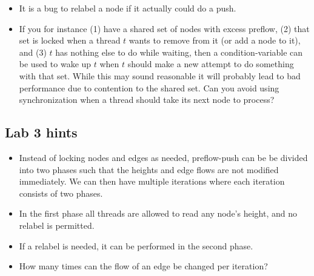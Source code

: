 \documentclass{forsete}
\begin{document}
{\begin{itemize}
Two techniques to avoid deadlocks are 
\begin{itemize}
\item Impose a lock-order which for instance says that for an edge $(u,v)$,
if a thread wants to lock both of $u$ and $v$, it must lock them in a
predefined order (for instance, $u$ first if $u < v$).
\item Use try-lock instead of lock. If the lock was already taken,
the thread is not blocked. If a thread is pushing from $u$ and finds $v$
locked, it can skip $v$ and check the next edge instead --- but see the
next hint about doing a relabel too early.
\end{itemize}

\item It is a bug to relabel a node if it actually could do a push.

\item If you for instance (1) have a shared set of nodes with excess 
preflow, (2) that set is locked when a thread $t$ wants to remove from it (or
add a node to it), and (3) $t$ has nothing else to do while waiting,
then a condition-variable can be used to wake up $t$ when $t$ should make
a new attempt to do something with that set. While this may sound reasonable
it will probably lead to bad performance due to contention to the shared set.
Can you avoid using synchronization when a thread should take its next node
to process?
\end{itemize}

\subsection*{Lab 3 hints}

\begin{itemize}
\item Instead of locking nodes and edges as needed, preflow-push can be
be divided into two phases such that the heights and edge flows
are not modified immediately. We can then have multiple iterations
where each iteration consists of two phases.

\item In the first phase all threads are allowed to read any node's 
height, and no relabel is permitted.

\item If a relabel is needed, it can be performed in the second phase.

\item How many times can the flow of an edge
be changed per iteration?


\end{itemize}}
\end{document}
